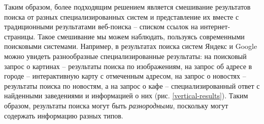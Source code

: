 \documentclass[12pt,a4paper]{report}
\newcommand\figref[1]{(рис. \ref{#1})}
\begin{document}
Таким образом, более подходящим решением является смешивание результатов поиска от разных специализированных систем и представление их вместе с традиционными результатами веб-поиска -- списком ссылок на интернет-страницы. Такое смешивание мы можем наблюдать, пользуясь современными поисковыми системами. Например, в результатах поиска систем Яндекс и Google можно увидеть разнообразные специализированные результаты: на поисковый запрос о картинах -- результаты поиска по изображениям, на запрос об адресе в городе --  интерактивную карту с отмеченным адресом, на запрос о новостях -- результаты поиска по новостям, а на запрос о кафе -- специализированный ответ с найденными заведениями и информацией о них \figref{vertical-results}. 
Таким образом, результаты поиска могут быть \emph{разнородными}, поскольку могут содержать информацию разных типов.
\end{document}
